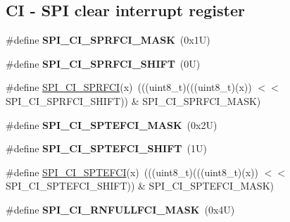 \subsection*{CI -\/ S\+PI clear interrupt register}
\begin{DoxyCompactItemize}
\item 
\mbox{\label{group___s_p_i___register___masks_ga3e5fe01782cdf8eecd6606aa6f98c520}} 
\#define {\bfseries S\+P\+I\+\_\+\+C\+I\+\_\+\+S\+P\+R\+F\+C\+I\+\_\+\+M\+A\+SK}~(0x1\+U)
\item 
\mbox{\label{group___s_p_i___register___masks_ga3bbcb06fc52355100c7fb5f03d22bf5b}} 
\#define {\bfseries S\+P\+I\+\_\+\+C\+I\+\_\+\+S\+P\+R\+F\+C\+I\+\_\+\+S\+H\+I\+FT}~(0\+U)
\item 
\#define \mbox{\hyperlink{group___s_p_i___register___masks_ga0a4bbbecb2c4190bad87f37c1bc7029e}{S\+P\+I\+\_\+\+C\+I\+\_\+\+S\+P\+R\+F\+CI}}(x)~(((uint8\+\_\+t)(((uint8\+\_\+t)(x)) $<$$<$ S\+P\+I\+\_\+\+C\+I\+\_\+\+S\+P\+R\+F\+C\+I\+\_\+\+S\+H\+I\+FT)) \& S\+P\+I\+\_\+\+C\+I\+\_\+\+S\+P\+R\+F\+C\+I\+\_\+\+M\+A\+SK)
\item 
\mbox{\label{group___s_p_i___register___masks_gabbeb1c93ae61d0aef29e551e72ebbe34}} 
\#define {\bfseries S\+P\+I\+\_\+\+C\+I\+\_\+\+S\+P\+T\+E\+F\+C\+I\+\_\+\+M\+A\+SK}~(0x2\+U)
\item 
\mbox{\label{group___s_p_i___register___masks_ga9706f5b51a14a583bbb447bc5baf9c34}} 
\#define {\bfseries S\+P\+I\+\_\+\+C\+I\+\_\+\+S\+P\+T\+E\+F\+C\+I\+\_\+\+S\+H\+I\+FT}~(1\+U)
\item 
\#define \mbox{\hyperlink{group___s_p_i___register___masks_gaac7ae75f2a134b1b7cf9c376972dbd46}{S\+P\+I\+\_\+\+C\+I\+\_\+\+S\+P\+T\+E\+F\+CI}}(x)~(((uint8\+\_\+t)(((uint8\+\_\+t)(x)) $<$$<$ S\+P\+I\+\_\+\+C\+I\+\_\+\+S\+P\+T\+E\+F\+C\+I\+\_\+\+S\+H\+I\+FT)) \& S\+P\+I\+\_\+\+C\+I\+\_\+\+S\+P\+T\+E\+F\+C\+I\+\_\+\+M\+A\+SK)
\item 
\mbox{\label{group___s_p_i___register___masks_ga4fdc1b39a903bdd8385e7e81f08e2f62}} 
\#define {\bfseries S\+P\+I\+\_\+\+C\+I\+\_\+\+R\+N\+F\+U\+L\+L\+F\+C\+I\+\_\+\+M\+A\+SK}~(0x4\+U)
\item 
\mbox{\label{group___s_p_i___register___masks_ga26d9aa726aeea3c33a074ff23b42f76b}} 

\end{DoxyCompactItemize}
